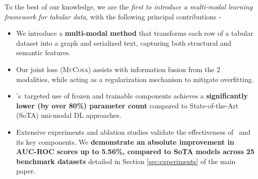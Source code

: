To the best of our knowledge, we are the \textit{first to introduce a multi-modal learning framework for tabular data}, with the following principal contributions -
\begin{itemize}
    \item We introduce a \textbf{multi-modal method} that transforms each row of a tabular dataset into a graph and serialized text, capturing both structural and semantic features.
    \item Our joint loss (\textsc{MuCosa}) assists with information fusion from the 2 modalities, while acting as a regularization mechanism to mitigate overfitting.
    \item \tabglm's~targeted use of frozen and trainable components achieves a \textbf{significantly lower (by over 80\%) parameter count} compared to State-of-the-Art (SoTA) uni-modal DL approaches.
    \item Extensive experiments and ablation studies validate the effectiveness of \tabglm\ and its key components. We \textbf{demonstrate an absolute improvement in AUC-ROC scores up to 5.56\%, compared to SoTA models across 25 benchmark datasets} detailed in Section \ref{sec:experiments} of the main paper.
\end{itemize}